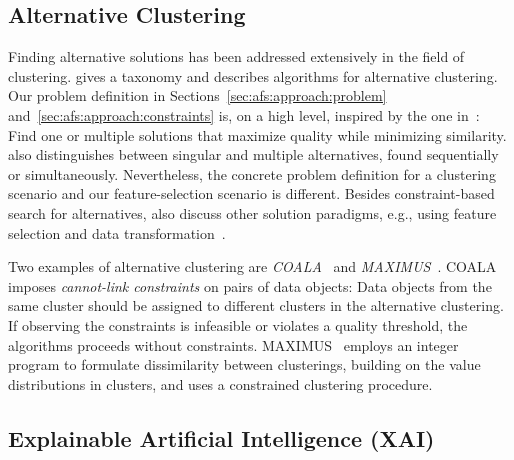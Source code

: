 \documentclass{article}
\theoremstyle{definition}
\begin{document}
\subsection{Alternative Clustering}

Finding alternative solutions has been addressed extensively in the field of clustering.
\cite{bailey2014alternative} gives a taxonomy and describes algorithms for alternative clustering.
Our problem definition in Sections~\ref{sec:afs:approach:problem} and~\ref{sec:afs:approach:constraints} is, on a high level, inspired by the one in~\cite{bailey2014alternative}:
Find one or multiple solutions that maximize quality while minimizing similarity.
\cite{bailey2014alternative} also distinguishes between singular and multiple alternatives, found sequentially or simultaneously.
Nevertheless, the concrete problem definition for a clustering scenario and our feature-selection scenario is different.
Besides constraint-based search for alternatives, \cite{bailey2014alternative} also discuss other solution paradigms, e.g., using feature selection and data transformation~\cite{tao2012novel}.

Two examples of alternative clustering are \emph{COALA}~\cite{bae2006coala} and \emph{MAXIMUS}~\cite{bae2010clustering}.
COALA~\cite{bae2006coala} imposes \emph{cannot-link constraints} on pairs of data objects:
Data objects from the same cluster should be assigned to different clusters in the alternative clustering.
If observing the constraints is infeasible or violates a quality threshold, the algorithms proceeds without constraints.
MAXIMUS~\cite{bae2010clustering} employs an integer program to formulate dissimilarity between clusterings, building on the value distributions in clusters, and uses a constrained clustering procedure.

\subsection{Explainable Artificial Intelligence (XAI)}
\end{document}

